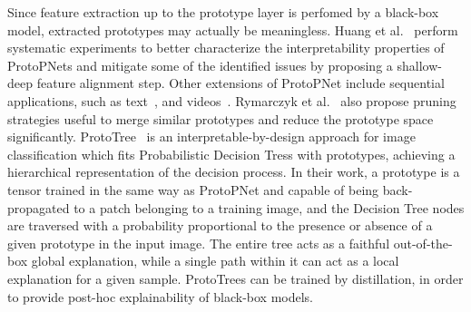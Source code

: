 Since feature extraction up to the prototype layer is perfomed by a black-box model, extracted prototypes may actually be meaningless. Huang et al.~\cite{huang2022protopnet} perform systematic experiments to better characterize the interpretability properties of ProtoPNets and mitigate some of the identified issues by proposing a shallow-deep feature alignment step.
%
Other extensions of ProtoPNet include sequential applications, such as text~\cite{ming2019interpretable}, and videos~\cite{trinh2021interpretable}.
Rymarczyk et al.~\cite{rymarczyk2021protopshare} also propose pruning strategies useful to merge similar prototypes and reduce the prototype space significantly.
%
ProtoTree~\cite{nauta2021neural} is an interpretable-by-design approach for image classification which fits Probabilistic Decision Tress with prototypes, achieving a hierarchical representation of the decision process.
In their work, a prototype is a tensor trained in the same way as ProtoPNet and capable of being back-propagated to a patch belonging to a training image, and the Decision Tree nodes are traversed with a probability proportional to the presence or absence of a given prototype in the input image. The entire tree acts as a faithful out-of-the-box global explanation, while a single path within it can act as a local explanation for a given sample.
ProtoTrees can be trained by distillation, in order to provide post-hoc explainability of black-box models.

